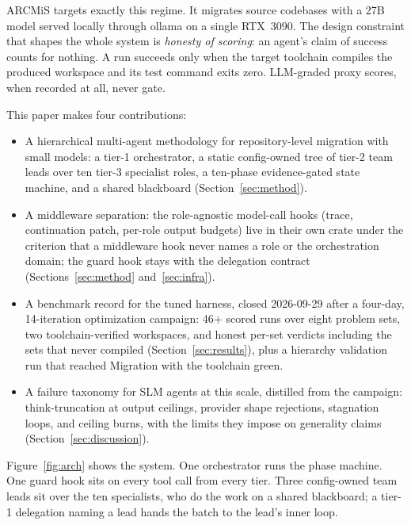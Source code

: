 \documentclass[11pt]{article}
\begin{document}
ARCMiS targets exactly this regime. It migrates source codebases with a
27B model served locally through ollama on a single RTX~3090. The design
constraint that shapes the whole system is \emph{honesty of scoring}: an
agent's claim of success counts for nothing. A run succeeds only when the
target toolchain compiles the produced workspace and its test command
exits zero. LLM-graded proxy scores, when recorded at all, never gate.

This paper makes four contributions:
\begin{itemize}
\item A hierarchical multi-agent methodology for repository-level
  migration with small models: a tier-1 orchestrator, a static
  config-owned tree of tier-2 team leads over ten tier-3 specialist
  roles, a ten-phase evidence-gated state machine, and a shared
  blackboard (Section~\ref{sec:method}).
\item A middleware separation: the role-agnostic model-call hooks
  (trace, continuation patch, per-role output budgets) live in their own
  crate under the criterion that a middleware hook never names a role or
  the orchestration domain; the guard hook stays with the delegation
  contract (Sections~\ref{sec:method} and~\ref{sec:infra}).
\item A benchmark record for the tuned harness, closed 2026-09-29 after a
  four-day, 14-iteration optimization campaign: 46+ scored runs over
  eight problem sets, two toolchain-verified workspaces, and honest
  per-set verdicts including the sets that never compiled
  (Section~\ref{sec:results}), plus a hierarchy validation run that
  reached \textsf{Migration} with the toolchain green.
\item A failure taxonomy for SLM agents at this scale, distilled from the
  campaign: think-truncation at output ceilings, provider shape
  rejections, stagnation loops, and ceiling burns, with the limits they
  impose on generality claims (Section~\ref{sec:discussion}).
\end{itemize}

Figure~\ref{fig:arch} shows the system. One orchestrator runs the phase
machine. One guard hook sits on every tool call from every tier. Three
config-owned team leads sit over the ten specialists, who do the work on
a shared blackboard; a tier-1 delegation naming a lead hands the batch
to the lead's inner loop.
\end{document}
